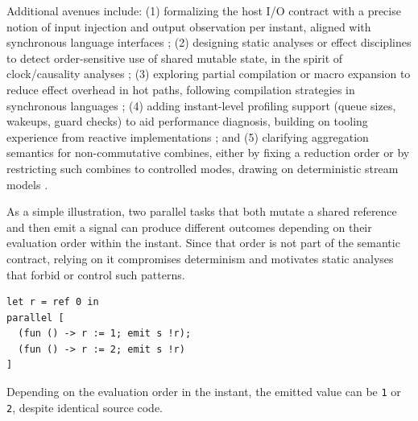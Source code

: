 Additional avenues include: (1) formalizing the host I/O contract with a
precise notion of input injection and output observation per instant, aligned
with synchronous language interfaces \cite{lustre1991,esterel1992}; (2)
designing static analyses or effect disciplines to detect order-sensitive use
of shared mutable state, in the spirit of clock/causality analyses
\cite{lustre1991,esterel1992}; (3) exploring partial compilation or macro
expansion to reduce effect overhead in hot paths, following compilation
strategies in synchronous languages \cite{esterel1992}; (4) adding instant-level
profiling support (queue sizes, wakeups, guard checks) to aid performance
diagnosis, building on tooling experience from reactive implementations
\cite{reactiveml2015}; and (5) clarifying aggregation semantics for
non-commutative combines, either by fixing a reduction order or by restricting
such combines to controlled modes, drawing on deterministic stream models
\cite{kahn1974}.

As a simple illustration, two parallel tasks that both mutate a shared
reference and then emit a signal can produce different outcomes depending on
their evaluation order within the instant. Since that order is not part of the
semantic contract, relying on it compromises determinism and motivates static
analyses that forbid or control such patterns.
\begin{lstlisting}[style=tempo]
let r = ref 0 in
parallel [
  (fun () -> r := 1; emit s !r);
  (fun () -> r := 2; emit s !r)
]
\end{lstlisting}
Depending on the evaluation order in the instant, the emitted value can be
\texttt{1} or \texttt{2}, despite identical source code.

